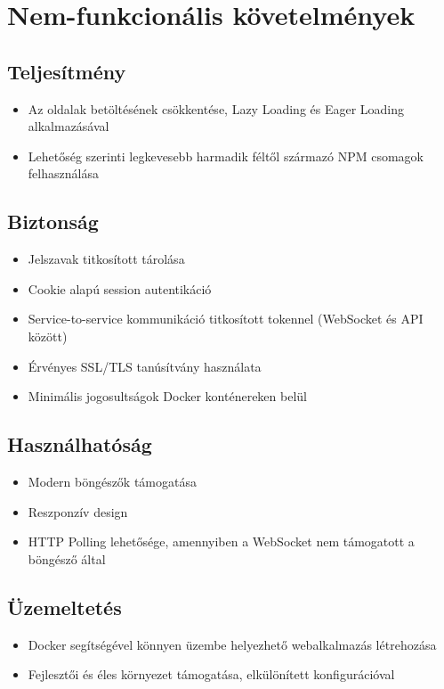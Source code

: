 \section{Nem-funkcionális követelmények}
\subsection*{Teljesítmény}
\begin{itemize}
    \item Az oldalak betöltésének csökkentése, Lazy Loading és Eager Loading alkalmazásával
    \item Lehetőség szerinti legkevesebb harmadik féltől származó NPM csomagok felhasználása
\end{itemize}
\subsection*{Biztonság}
\begin{itemize}
    \item Jelszavak titkosított tárolása
    \item Cookie alapú session autentikáció
    \item Service-to-service kommunikáció titkosított tokennel (WebSocket és API között)
    \item Érvényes SSL/TLS tanúsítvány használata
    \item Minimális jogosultságok Docker konténereken belül
\end{itemize}
\subsection*{Használhatóság}
\begin{itemize}
    \item Modern böngészők támogatása
    \item Reszponzív design
    \item HTTP Polling lehetősége, amennyiben a WebSocket nem támogatott a böngésző által
\end{itemize}
\subsection*{Üzemeltetés}
\begin{itemize}
    \item Docker segítségével könnyen üzembe helyezhető webalkalmazás létrehozása
    \item Fejlesztői és éles környezet támogatása, elkülönített konfigurációval
\end{itemize}
